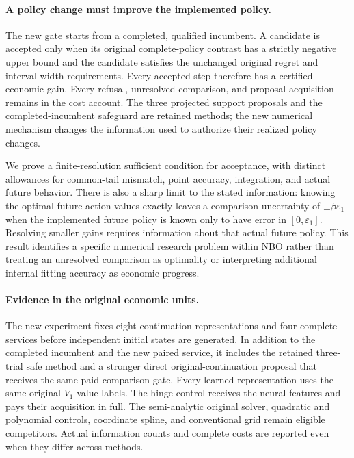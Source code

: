 \paragraph{A policy change must improve the implemented policy.}
The new gate starts from a completed, qualified incumbent. A candidate is
accepted only when its original complete-policy contrast has a strictly negative
upper bound and the candidate satisfies the unchanged original regret and
interval-width requirements. Every accepted step therefore has a certified
economic gain. Every refusal, unresolved comparison, and proposal acquisition
remains in the cost account. The three projected support proposals and the
completed-incumbent safeguard are retained methods; the new numerical mechanism
changes the information used to authorize their realized policy changes.

We prove a finite-resolution sufficient condition for acceptance, with distinct
allowances for common-tail mismatch, point accuracy, integration, and actual
future behavior. There is also a sharp limit to the stated information: knowing
the optimal-future action values exactly leaves a comparison uncertainty of
$\pm\beta\varepsilon_1$ when the implemented future policy is known only to
have error in $[0,\varepsilon_1]$. Resolving smaller gains requires information
about that actual future policy. This result identifies a specific numerical
research problem within NBO rather than treating an unresolved comparison as
optimality or interpreting additional internal fitting accuracy as economic
progress.

\paragraph{Evidence in the original economic units.}
The new experiment fixes eight continuation representations and four complete
services before independent initial states are generated. In addition to the
completed incumbent and the new paired service, it includes the retained
three-trial safe method and a stronger direct original-continuation proposal
that receives the same paid comparison gate. Every learned representation uses
the same original $V_1$ value labels. The hinge control receives the neural
features and pays their acquisition in full. The semi-analytic original solver,
quadratic and polynomial controls, coordinate spline, and conventional grid
remain eligible competitors. Actual information counts and complete costs are
reported even when they differ across methods.


